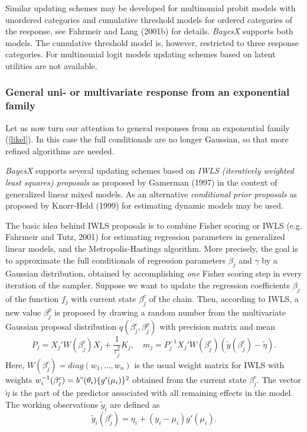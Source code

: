 \documentclass[11pt,a4paper,twoside]{bayesxarticle}
\begin{document}
Similar updating schemes may be developed for multinomial probit
models with unordered categories and cumulative threshold models
for ordered categories of the response, see Fahrmeir and Lang
(2001b) for details. {\em BayesX} supports both models. The
cumulative threshold model is, however, restricted to three
response categories. For multinomial logit models updating schemes
based on latent utilities are not available.

\subsubsection{General uni- or multivariate response from an exponential family}
\label{IWLS}


Let us now turn our attention to general responses from an
exponential family (\ref{likel}). In this case the full
conditionals are no longer Gaussian, so that more refined
algorithms are needed.

{\em BayesX} supports several updating schemes based on {\em IWLS
(iteratively weighted least squares) proposals} as proposed by
Gamerman (1997) in the context of generalized linear mixed models.
As an alternative {\em conditional prior proposals} as proposed by
Knorr-Held (1999) for estimating dynamic models may be used.


The basic idea behind IWLS proposals is to combine Fisher scoring
or IWLS (e.g. Fahrmeir and Tutz, 2001) for estimating regression
parameters in generalized linear models, and the
Metropolis-Hastings algorithm. More precisely, the goal is to
approximate the full conditionals of regression parameters
$\beta_j$ and $\gamma$ by a Gaussian distribution, obtained by
accomplishing {\em one} Fisher scoring step in every iteration of
the sampler. Suppose we want to update the regression coefficients
$\beta_j$ of the  function $f_j$ with current state $\beta_j^c$ of
the chain. Then, according to IWLS, a new value $\beta_j^p$ is
proposed by drawing a random number from the multivariate Gaussian
proposal distribution $q(\beta_j^c,\beta_j^p)$ with precision
matrix and mean
\begin{equation}
\label{prec} P_j = X_j'W(\beta^c_j)X_j + \frac{1}{\tau^2_j}K_j,
\quad m_j = P_j^{-1}X_j'W(\beta^c_j)(\tilde{y}(\beta^c_j) -
\tilde{\eta}).
\end{equation}
Here, $W(\beta^c_j) = diag(w_1,\dots,w_n)$ is the usual weight
matrix for IWLS with weights $w^{-1}_i(\beta^c_j) =
b"(\theta_i)\{g'(\mu_i)\}^2$ obtained from the current state
$\beta^c_j$. The vector $\tilde{\eta}$ is the part of the
predictor associated with all remaining effects in the model. The
working observations $\tilde{y}_i$ are defined as
$$\tilde{y}_i(\beta^c_j) = \eta_i + (y_i - \mu_i)g'(\mu_i).$$
\end{document}
